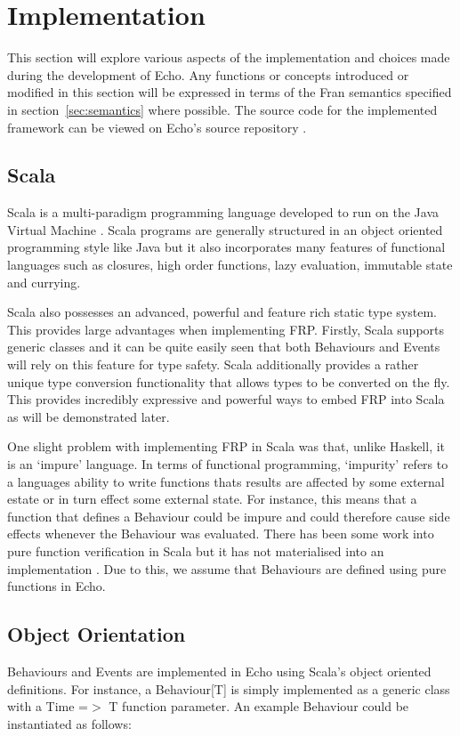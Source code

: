 \chapter{Implementation}
  This section will explore various aspects of the implementation and choices made during the development
  of Echo. Any functions or concepts introduced or modified in this section will be expressed in terms
  of the Fran semantics specified in section~\ref{sec:semantics} where possible. The source code for
  the implemented framework can be viewed on Echo's source repository \cite{Stott}.
  
  \section{Scala}
    Scala is a multi-paradigm programming language developed to run on the Java Virtual Machine \cite{Odersky2004}. Scala 
    programs are
    generally structured in an object oriented programming style like Java but it also incorporates many features of
    functional languages such as closures, high order functions, lazy evaluation, immutable state and currying.

    Scala also possesses an advanced, powerful and feature rich static type system. This provides large
    advantages when implementing FRP. Firstly, Scala supports generic classes and it can be quite easily seen
    that both Behaviours and Events will rely on this feature for type safety. Scala additionally provides
    a rather unique type conversion functionality that allows types to be converted on the fly. This provides
    incredibly expressive and powerful ways to embed FRP into Scala as will be demonstrated later.
    
    One slight problem with implementing FRP in Scala was that, unlike Haskell, it is an `impure'
    language. In terms of functional programming, `impurity' refers to a languages ability to write functions
    thats results are affected by some external estate or in turn effect some external state. For instance,
    this means that a function that defines a Behaviour could be impure and could therefore cause side effects
    whenever the Behaviour was evaluated. There has been some work into pure function verification in Scala but it has not 
    materialised into an  
    implementation \cite{Nordenberg}. Due to this, we assume that Behaviours are defined using pure functions in Echo.
    
  \section{Object Orientation}
    Behaviours and Events are implemented in
    Echo using Scala's object oriented definitions. For instance, a Behaviour[T] is simply
    implemented as a generic class with a Time =$>$ T function parameter. An example Behaviour
    could be instantiated as follows:

